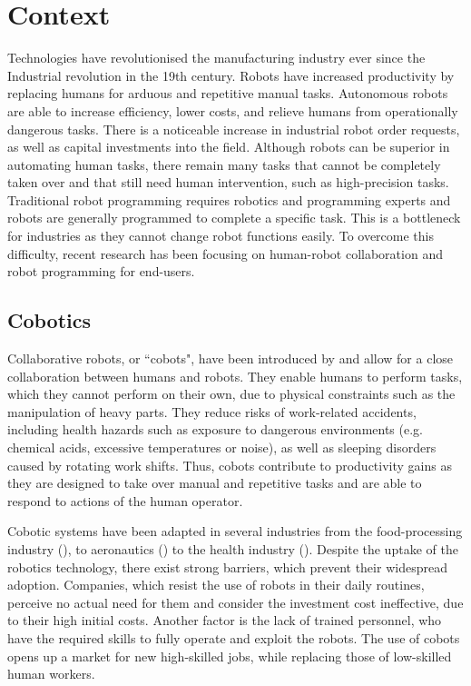 \section{Context}
Technologies have revolutionised the manufacturing industry ever since the Industrial revolution in the 19th century.
Robots have increased productivity by replacing humans for arduous and repetitive manual tasks.
Autonomous robots are able to increase efficiency, lower costs, and relieve humans from operationally dangerous tasks.
There is a noticeable increase in industrial robot order requests, as well as capital investments into the field.
Although robots can be superior in automating human tasks, there remain many tasks that cannot be completely taken over and that still need human intervention, such as high-precision tasks.
Traditional robot programming requires robotics and programming experts and robots are generally programmed to complete a specific task.
This is a bottleneck for industries as they cannot change robot functions easily.
To overcome this difficulty, recent research has been focusing on human-robot collaboration and robot programming for end-users.


\subsection{Cobotics}\label{subsec:Cobotics}
Collaborative robots, or ``cobots", have been introduced by \cite{colgate1999cobots} and allow for a close collaboration between humans and robots.
They enable humans to perform tasks, which they cannot perform on their own, due to physical constraints such as the manipulation of heavy parts.
They reduce risks of work-related accidents, including health hazards such as exposure to dangerous environments (e.g. chemical acids, excessive temperatures or noise), as well as sleeping disorders caused by rotating work shifts.
Thus, cobots contribute to productivity gains as they are designed to take over manual and repetitive tasks and are able to respond to actions of the human operator.

Cobotic systems have been adapted in several industries from the food-processing industry (\cite{Food}), to aeronautics (\cite{Airbus}) to the health industry (\cite{Ebola}).
Despite the uptake of the robotics technology, there exist strong barriers, which prevent their widespread adoption.
Companies, which resist the use of robots in their daily routines, perceive no actual need for them and consider the investment cost ineffective, due to their high initial costs.
Another factor is the lack of trained personnel, who have the required skills to fully operate and exploit the robots.
The use of cobots opens up a market for new high-skilled jobs, while replacing those of low-skilled human workers.

